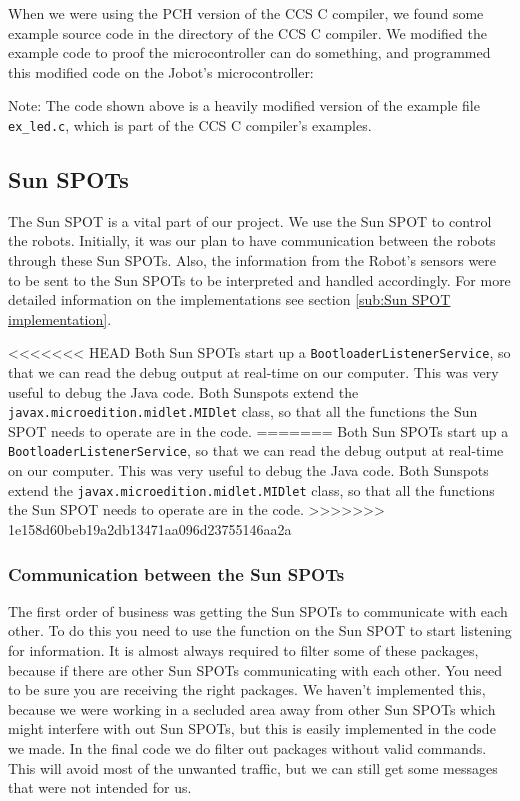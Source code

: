 \documentclass[a4paper,10pt]{article} %
\begin{document}
When we were using the PCH version of the CCS C compiler, we found some example
source code in the directory of the CCS C compiler. We modified the example code
to proof the microcontroller can do something, and programmed this modified code
on the Jobot's microcontroller:



\noindent Note: The code shown above is a heavily modified version of the
example file \texttt{ex\_led.c}, which is part of the CCS C compiler's examples.



\subsection{Sun SPOTs} %
\label{sec:sunspot}

The Sun SPOT is a vital part of our project. We use the Sun SPOT to control the
robots. Initially, it was our plan to have communication between the robots
through these Sun SPOTs. Also, the information from the Robot's sensors were to
be sent to the Sun SPOTs to be interpreted and handled accordingly. For more
detailed information on the implementations see section \ref{sub:Sun SPOT
implementation}.

<<<<<<< HEAD
Both Sun SPOTs start up
a \texttt{BootloaderListenerService}, so that we can read the debug output at
real-time on our computer. This was very useful to debug the Java code. Both
Sunspots extend the 
\texttt{javax.microedition.midlet.MIDlet} class, so that all
the functions the Sun SPOT needs to operate are in the code.
=======
Both Sun SPOTs start up a \texttt{BootloaderListenerService}, so that we can
read the debug output at real-time on our computer. This was very useful to
debug the Java code. Both Sunspots extend the
\texttt{javax.microedition.midlet.MIDlet} class, so that all the functions the
Sun SPOT needs to operate are in the code.
>>>>>>> 1e158d60beb19a2db13471aa096d23755146aa2a

\subsubsection{Communication between the Sun SPOTs} %
\label{subsec:comm}

The first order of business was getting the Sun SPOTs to communicate with each
other. To do this you need to use the function on the Sun SPOT to start
listening for information. It is almost always required to filter some of these
packages, because if there are other Sun SPOTs communicating with each other.
You need to be sure you are receiving the right packages. We haven't implemented
this, because we were working in a secluded area away from other Sun SPOTs which
might interfere with out Sun SPOTs, but this is easily implemented in the code
we made. In the final code we do filter out packages without valid commands.
This will avoid most of the unwanted traffic, but we can still get some messages
that were not intended for us.
\end{document}
